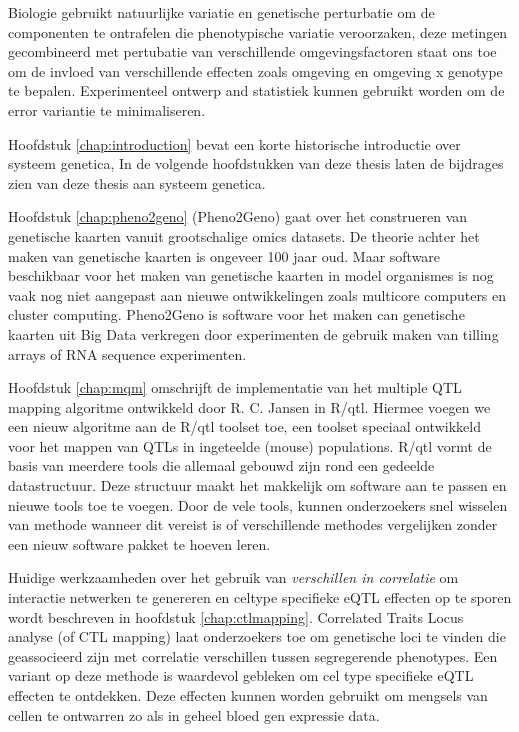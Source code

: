 Biologie gebruikt natuurlijke variatie en genetische perturbatie om de componenten te ontrafelen
die phenotypische variatie veroorzaken, deze metingen gecombineerd met pertubatie van verschillende 
omgevingsfactoren staat ons toe om de invloed van verschillende effecten zoals omgeving en 
omgeving x genotype te bepalen. Experimenteel ontwerp and statistiek kunnen gebruikt worden om 
de error variantie te minimaliseren.

Hoofdstuk \ref{chap:introduction} bevat een korte historische introductie over systeem genetica, 
In de volgende hoofdstukken van deze thesis laten de bijdrages zien van deze thesis aan systeem genetica.

Hoofdstuk \ref{chap:pheno2geno} (Pheno2Geno) gaat over het construeren van genetische kaarten vanuit grootschalige 
omics datasets. De theorie achter het maken van genetische kaarten is ongeveer 100 jaar oud. Maar 
software beschikbaar voor het maken van genetische kaarten in model organismes is nog 
vaak nog niet aangepast aan nieuwe ontwikkelingen zoals multicore computers en cluster computing. 
Pheno2Geno is software voor het maken can genetische kaarten uit Big Data verkregen door 
experimenten de gebruik maken van tilling arrays of RNA sequence experimenten.

Hoofdstuk \ref{chap:mqm} omschrijft de implementatie van het multiple QTL mapping algoritme ontwikkeld door 
R. C. Jansen in R/qtl. Hiermee voegen we een nieuw algoritme aan de R/qtl toolset toe, een 
toolset speciaal ontwikkeld voor het mappen van QTLs in ingeteelde (mouse) populations. R/qtl 
vormt de basis van meerdere tools die allemaal gebouwd zijn rond een gedeelde datastructuur. 
Deze structuur maakt het makkelijk om software aan te passen en nieuwe tools toe te voegen.
Door de vele tools, kunnen onderzoekers snel wisselen van methode wanneer dit vereist is of 
verschillende methodes vergelijken zonder een nieuw software pakket te hoeven leren.

Huidige werkzaamheden over het gebruik van \emph{verschillen in correlatie} om interactie 
netwerken te genereren en celtype specifieke eQTL effecten op te sporen wordt beschreven in 
hoofdstuk \ref{chap:ctlmapping}. Correlated Traits Locus analyse (of CTL mapping) laat 
onderzoekers toe om genetische loci te vinden die geassocieerd zijn met correlatie verschillen 
tussen segregerende phenotypes. Een variant op deze methode is waardevol gebleken om cel 
type specifieke eQTL effecten te ontdekken. Deze effecten kunnen worden gebruikt om mengsels 
van cellen te ontwarren zo als in geheel bloed gen expressie data.

